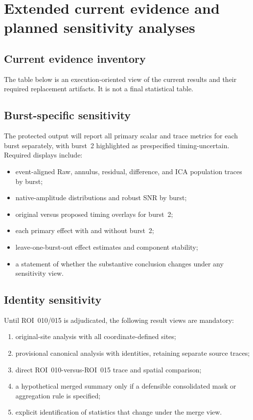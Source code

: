 \section{Extended current evidence and planned sensitivity analyses}
\label{sec:supp-results}

\subsection{Current evidence inventory}

The table below is an execution-oriented view of the current results and their required replacement artifacts. It is not a final statistical table.



\subsection{Burst-specific sensitivity}

The protected output will report all primary scalar and trace metrics for each burst separately, with burst~2 highlighted as prespecified timing-uncertain. Required displays include:
\begin{itemize}
  \item event-aligned Raw, annulus, residual, difference, and ICA population traces by burst;
  \item native-amplitude distributions and robust SNR by burst;
  \item original versus proposed timing overlays for burst~2;
  \item each primary effect with and without burst~2;
  \item leave-one-burst-out effect estimates and component stability;
  \item a statement of whether the substantive conclusion changes under any sensitivity view.
\end{itemize}

\subsection{Identity sensitivity}

Until ROI~010/015 is adjudicated, the following result views are mandatory:
\begin{enumerate}
  \item original-site analysis with all \NCurrentOriginalSites{} coordinate-defined sites;
  \item provisional canonical analysis with \NCurrentCanonicalNeurons{} identities, retaining separate source traces;
  \item direct ROI~010-versus-ROI~015 trace and spatial comparison;
  \item a hypothetical merged summary only if a defensible consolidated mask or aggregation rule is specified;
  \item explicit identification of statistics that change under the merge view.
\end{enumerate}

